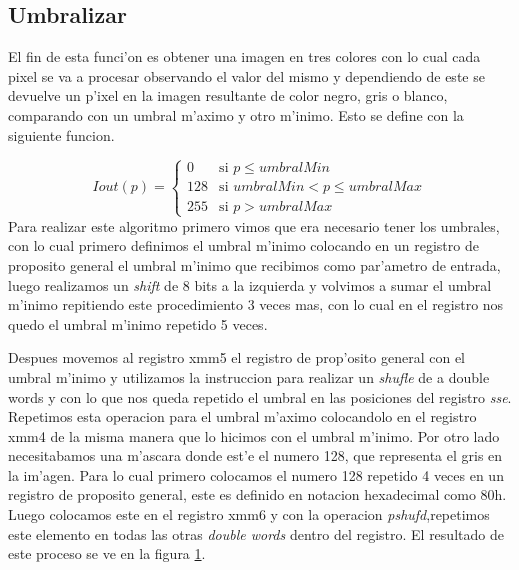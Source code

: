 \subsection{Umbralizar}
El fin de esta funci'on es obtener una imagen en tres colores con lo cual cada pixel se va a procesar observando el valor del 
mismo y dependiendo de este se devuelve un p'ixel en la imagen resultante de color negro, gris o blanco, 
comparando con un umbral m'aximo y otro m'inimo.
Esto se define con la siguiente funcion.

$$Iout(p) = \left\{\begin{array}{lcc} 0 & \text{si } p \leq umbralMin\\  128 & \text{si } umbralMin < p \leq umbralMax \\ 255 & \text{si } p > umbralMax \end{array} \right. $$
Para realizar este algoritmo primero vimos que era necesario tener los umbrales, con lo cual primero definimos el umbral 
m'inimo colocando en un registro de proposito general el umbral m'inimo que recibimos como par'ametro de entrada, 
luego realizamos un \textit{shift} de 8 bits a la izquierda y volvimos a sumar el umbral m'inimo repitiendo este procedimiento 3 veces mas, 
con lo cual en el registro nos quedo el umbral m'inimo repetido 5 veces.

Despues movemos al registro xmm5 el registro de prop'osito general con el umbral m'inimo y utilizamos la instruccion para 
realizar un \textit{shufle} de a double words y con lo que nos queda repetido el umbral en las posiciones del registro \textit{sse}. 
Repetimos esta operacion para el umbral m'aximo colocandolo en el registro xmm4 de la misma manera que lo hicimos con el umbral m'inimo.
Por otro lado necesitabamos una m'ascara donde est'e el numero 128, que representa el gris en la im'agen.
Para lo cual primero colocamos el numero 128 repetido 4 veces en un registro de proposito general,  
este es definido en notacion hexadecimal como 80h. Luego colocamos este en el registro xmm6 y con la operacion 
\textit{pshufd},repetimos este elemento en todas las otras \textit{double words} dentro del registro.
El resultado de este proceso se ve en la figura \ref{est:u-uno}.

\begin{figure}[ht]
\label{est:u-uno}
\end{figure}

